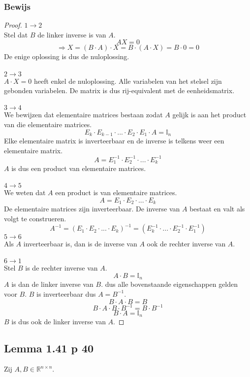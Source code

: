 \documentclass[lineaire_algebra_oplossingen.tex]{subfiles}
\begin{document}
\subsubsection*{Bewijs}
\begin{proof}
\textbf{$1 \rightarrow 2$ }\\
Stel dat $B$ de linker inverse is van $A$.
\[
AX = 0 
\]
\[
\Rightarrow X = (B\cdot A)\cdot X = B \cdot (A\cdot X) = B\cdot 0=0
\]
De enige oplossing is dus de nuloplossing.\\\\
\textbf{$2 \rightarrow 3$ }\\
$A\cdot X = 0$ heeft enkel de nuloplossing. Alle variabelen van het stelsel zijn gebonden variabelen. De matrix is dus rij-equivalent met de eenheidsmatrix.\\\\
\textbf{$3 \rightarrow 4$ }\\
We bewijzen dat elementaire matrices bestaan zodat $A$ gelijk is aan het product van die elementaire matrices.
\[
E_{k}\cdot E_{k-1}\cdot ... \cdot E_{2}\cdot E_{1}\cdot A = \mathbb{I}_{n}
\]
Elke elementaire matrix is inverteerbaar en de inverse is telkens weer een elementaire matrix.
\[
A = E_{1}^{-1}\cdot E_{2}^{-1}\cdot ...\cdot  E_{k}^{-1}
\]
$A$ is dus een product van elementaire matrices.
\\\\
\textbf{$4 \rightarrow 5$ }\\
We weten dat $A$ een product is van elementaire matrices.
\[
A = E_1\cdot E_2 \cdot ... \cdot E_k
\]
De elementaire matrices zijn inverteerbaar. De inverse van $A$ bestaat en valt als volgt te construeren.
\[
A^{-1} = (E_1\cdot E_2 \cdot ... \cdot E_k)^{-1} = (E_k^{-1}\cdot ...\cdot E_2^{-1}\cdot E_1^{-1})
\]
\textbf{$5 \rightarrow 6$ }\\
Als $A$ inverteerbaar is, dan is de inverse van $A$ ook de rechter inverse van $A$.\\\\
\textbf{$6 \rightarrow 1$ }\\
Stel $B$ is de rechter inverse van $A$.
\[
A\cdot B = \mathbb{I}_n
\]
$A$ is dan de linker inverse van $B$. dus alle bovenstaande eigenschappen gelden voor $B$. $B$ is inverteerbaar dus $A = B^{-1}$.
\[
B\cdot A\cdot B = B
\]
\[
B\cdot A \cdot B \cdot B^{-1} = B \cdot B^{-1}
\]
\[
B\cdot A = \mathbb{I}_n
\]
$B$ is dus ook de linker inverse van $A$.
\end{proof}


\subsection{Lemma 1.41 p 40}
\label{1.41}
Zij $A,B \in \mathbb{R}^{n\times n}$.
\end{document}

